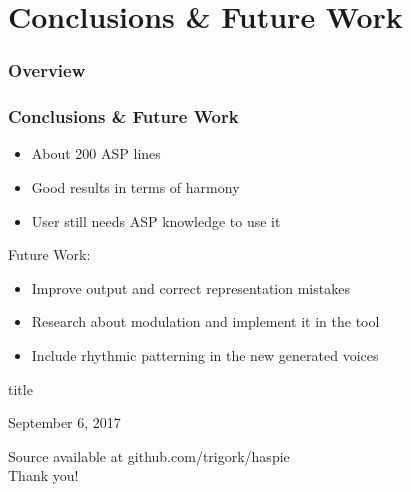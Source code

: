 \documentclass[english,fragile]{beamer}
\begin{document}
\section{Conclusions \& Future Work}
\begin{frame}
	\frametitle{Overview}
\end{frame}
	\begin{frame}
		\frametitle{Conclusions \& Future Work}
        \begin{itemize}
        \item About 200 ASP lines
        \item Good results in terms of harmony
        \item User still needs \alert{ASP knowledge} to use it
        \end{itemize}
        \vspace{10mm}
        Future Work:
		\begin{itemize}
			\item Improve \alert{output} and correct representation mistakes
			\item Research about \alert{modulation} and implement it in the tool
			\item Include \alert{rhythmic patterning} in the new generated voices
		\end{itemize}
	\end{frame}
		
\begin{frame}
\centering
\begin{beamercolorbox}[rounded=true,shadow=true,sep=8pt,center]{title}
\inserttitle \par
\end{beamercolorbox}
\vfill
\centering
\insertauthor
\vfill
September 6, 2017\par
\begin{center}
\vfill
Source available at \alert{github.com/trigork/haspie}\\
\vspace{5mm}
\alert{Thank you!}
\end{center}
\end{frame}
\end{document}
